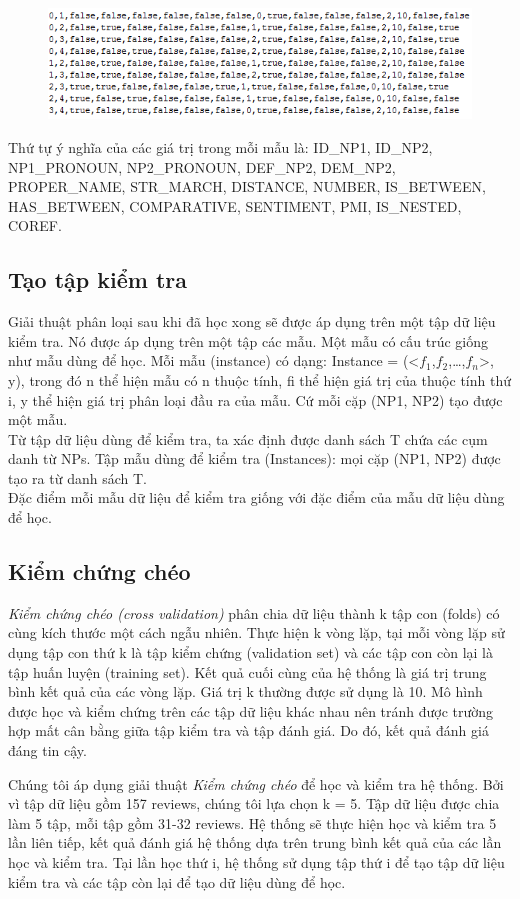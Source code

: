 \documentclass[12pt]{report}
\begin{document}
				\begin{figure}[H] 
					\centering
					\includegraphics{images/examples_train.png}
				\end{figure} 
				\par Thứ tự ý nghĩa của các giá trị trong mỗi mẫu là: ID\_NP1, ID\_NP2, NP1\_PRONOUN, NP2\_PRONOUN, DEF\_NP2, DEM\_NP2, PROPER\_NAME, STR\_MARCH, DISTANCE, NUMBER, IS\_BETWEEN, HAS\_BETWEEN, COMPARATIVE, SENTIMENT, PMI, IS\_NESTED, COREF.
			\subsection*{Tạo tập kiểm tra}
				\par Giải thuật phân loại sau khi đã học xong sẽ được áp dụng trên một tập dữ liệu kiểm tra. Nó được áp dụng trên một tập các mẫu. Một mẫu có cấu trúc giống như mẫu dùng để học. Mỗi mẫu (instance) có dạng: Instance = (<$f_1$,$f_2$,…,$f_n$>, y), trong đó n thể hiện mẫu có n thuộc tính, fi thể hiện giá trị của thuộc tính thứ i, y thể hiện giá trị phân loại đầu ra của mẫu. Cứ mỗi cặp (NP1, NP2) tạo được một mẫu. 
				\\Từ tập dữ liệu dùng để kiểm tra, ta xác định được danh sách T chứa các cụm danh từ NPs. Tập mẫu dùng để kiểm tra (Instances): mọi cặp (NP1, NP2) được tạo ra từ danh sách T.
				\\Đặc điểm mỗi mẫu dữ liệu để kiểm tra giống với đặc điểm của mẫu dữ liệu dùng để học.
			\subsection*{Kiểm chứng chéo}
				\par \textit{Kiểm chứng chéo (cross validation)} phân chia dữ liệu thành k tập con (folds) có cùng kích thước một cách ngẫu nhiên. Thực hiện k vòng lặp, tại mỗi vòng lặp sử dụng tập con thứ k là tập kiểm chứng (validation set) và các tập con còn lại là tập huấn luyện (training set). Kết quả cuối cùng của hệ thống là giá trị trung bình kết quả của các vòng lặp. Giá trị k thường được sử dụng là 10. Mô hình được học và kiểm chứng trên các tập dữ liệu khác nhau nên tránh được trường hợp mất cân bằng giữa tập kiểm tra và tập đánh giá. Do đó, kết quả đánh giá đáng tin cậy.
				\par Chúng tôi áp dụng giải thuật \textit{Kiểm chứng chéo} để học và kiểm tra hệ thống. Bởi vì tập dữ liệu gồm 157 reviews, chúng tôi lựa chọn k = 5. Tập dữ liệu được chia làm 5 tập, mỗi tập gồm 31-32 reviews. Hệ thống sẽ thực hiện học và kiểm tra 5 lần liên tiếp, kết quả đánh giá hệ thống dựa trên trung bình kết quả của các lần học và kiểm tra. Tại lần học thứ i, hệ thống sử dụng tập thứ i để tạo tập dữ liệu kiểm tra và các tập còn lại để tạo dữ liệu dùng để học.
\end{document}

